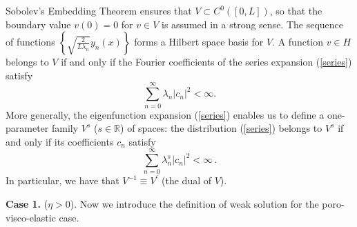 \documentclass[12pt,a4paper]{amsart}
\theoremstyle{definition}
\begin{document}
Sobolev's Embedding Theorem ensures that $V\subset C^{0}\left( \left[
0,L\right] \right) $, so that the boundary value $v\left( 0\right) =0$ for $%
v\in V$ is assumed in a strong sense. The sequence of functions $\left\{
\sqrt{\frac{2}{L\lambda _{n}}}y_{n}\left( x\right) \right\} $ forms a
Hilbert space basis for $V$. A function $v\in H$ belongs to $V$ if and only
if the Fourier coefficients of the series expansion (\ref{series}) satisfy%
\begin{equation*}
\sum_{n=0}^{\infty }\lambda _{n}\left\vert c_{n}\right\vert ^{2}<\infty.
\end{equation*}
More generally, the eigenfunction expansion (\ref{series}) enables us to define a
one-parameter family $V^{s}$ ($s\in \mathbb{R}$) of spaces: the
distribution (\ref{series}) belongs to $V^{s}$ if and only if its coefficients $c_{n}$
satisfy%
\begin{equation*}
\sum_{n=0}^{\infty }\lambda _{n}^{s}\left\vert c_{n}\right\vert ^{2} <\infty \,.
\end{equation*}%
In particular, we have that $V^{-1}\equiv V^{\prime }$ (the dual of $V$).

{\bf Case 1.} ($\eta >0$). 
Now we introduce the definition of weak solution for the poro-visco-elastic case.
\end{document}
